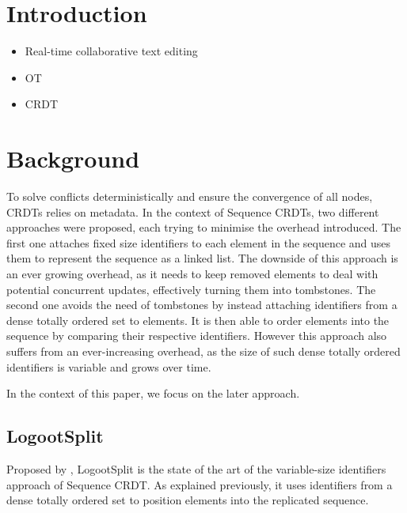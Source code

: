 \documentclass[sigplan,10pt]{acmart}
\begin{document}
\section{Introduction}

\begin{itemize}
    \item Real-time collaborative text editing
    \item \ac{OT}
    \item \ac{CRDT} \cite{shapiro_2011_crdt}
\end{itemize}

\section{Background}

To solve conflicts deterministically and ensure the convergence of all nodes, \acp{CRDT} relies on metadata.
In the context of Sequence \acp{CRDT}, two different approaches were proposed, each trying to minimise the overhead introduced.
The first one \cite{oster:inria-00108523, ROH2011354,briot:hal-01343941} attaches fixed size identifiers to each element in the sequence and uses them to represent the sequence as a linked list.
The downside of this approach is an ever growing overhead, as it needs to keep removed elements to deal with potential concurrent updates, effectively turning them into tombstones.
The second one \cite{5158449,WeissICDCS09,AndreCollaborateCom2013} avoids the need of tombstones by instead attaching identifiers from a dense totally ordered set to elements.
It is then able to order elements into the sequence by comparing their respective identifiers.
However this approach also suffers from an ever-increasing overhead, as the size of such dense totally ordered identifiers is variable and grows over time.

In the context of this paper, we focus on the later approach.

\subsection{LogootSplit}

Proposed by \citet{AndreCollaborateCom2013}, LogootSplit is the state of the art of the variable-size identifiers approach of Sequence \ac{CRDT}.
As explained previously, it uses identifiers from a dense totally ordered set to position elements into the replicated sequence.
\end{document}
